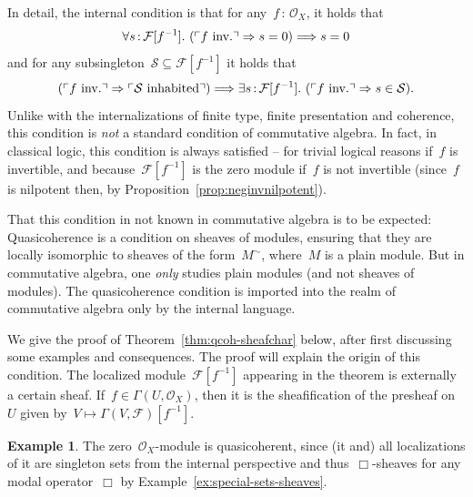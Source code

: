 \documentclass[10pt,reqno,a4paper]{amsbook}
\makeatletter
\theoremstyle{definition}
\newtheorem{ex}[defn]{Example}
\theoremstyle{plain}
\theoremstyle{remark}
\newcommand{\F}{\mathcal{F}}
\renewcommand{\O}{\mathcal{O}}
\renewcommand{\S}{\mathcal{S}}
\newcommand{\?}{\,{:}\,}
\renewcommand{\_}{\mathpunct{.}\,}
\newcommand{\speak}[1]{\ulcorner\text{\textnormal{#1}}\urcorner}
\newcommand{\inv}{inv.\@}
\makeatother
\begin{document}
In detail, the internal condition is that for any~$f\?\O_X$, it holds that
\[ \forall s\?\F[f^{-1}]\_
  (\speak{$f$ \inv} \Rightarrow s = 0) \Longrightarrow s = 0 \]
and for any subsingleton~$\S \subseteq \F[f^{-1}]$ it holds that
\[ (\speak{$f$ \inv} \Rightarrow \speak{$\S$ inhabited}) \Longrightarrow
  \exists s\?\F[f^{-1}]\_
  (\speak{$f$ \inv} \Rightarrow s \in \S). \]
Unlike with the internalizations of finite type, finite presentation and
coherence, this condition is \emph{not} a standard condition of commutative
algebra. In fact, in classical logic, this condition is always satisfied --
for trivial logical reasons if~$f$ is invertible, and because~$\F[f^{-1}]$ is
the zero module if~$f$ is not invertible (since~$f$ is nilpotent then, by
Proposition~\ref{prop:neginvnilpotent}).

That this condition in not known in commutative algebra is to be expected:
Quasicoherence is a condition on sheaves of modules, ensuring
that they are locally isomorphic to sheaves of the form~$M^\sim$,
where~$M$ is a plain module. But in commutative algebra, one \emph{only} studies plain
modules (and not sheaves of modules). The quasicoherence condition is imported
into the realm of commutative algebra only by the internal language.

We give the proof of Theorem~\ref{thm:qcoh-sheafchar} below, after first discussing some examples
and consequences. The proof will explain the origin of this condition.
The localized module~$\F[f^{-1}]$ appearing in the theorem
is externally a certain sheaf. If~$f \in \Gamma(U,\O_X)$, then it is the
sheafification of the presheaf on~$U$ given by~$V \mapsto
\Gamma(V,\F)[f^{-1}]$.

\begin{ex}The zero~$\O_X$-module is quasicoherent, since (it and) all
localizations of it are singleton sets from the internal perspective and
thus~$\Box$-sheaves for any modal operator~$\Box$
by Example~\ref{ex:special-sets-sheaves}.\end{ex}
\end{document}
